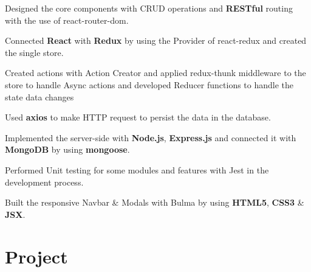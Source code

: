 \documentclass[letterpaper]{deedy-resume} %
\begin{document}
\begin{minipage}[t]{0.66\textwidth}
\vspace{\topsep} %
\begin{tightitemize}
	\item Designed the core components with CRUD operations and \textbf{RESTful} routing with the use of react-router-dom.
	\item Connected \textbf{React} with \textbf{Redux} by using the Provider of react-redux and created the single store.
	\item Created actions with Action Creator and applied redux-thunk middleware to the store to handle Async actions and developed Reducer functions to handle the state data changes
	\item Used \textbf{axios} to make HTTP request to persist the data in the database.
	\item Implemented the server-side with \textbf{Node.js}, \textbf{Express.js} and connected it with \textbf{MongoDB} by using \textbf{mongoose}.
	\item Performed Unit testing for some modules and features with Jest in the development process.
	\item Built the responsive Navbar \& Modals with Bulma by using\textbf{ HTML5}, \textbf{CSS3} \& \textbf{JSX}.
	
\end{tightitemize}
\section{Project}


\end{minipage}
\end{document}
